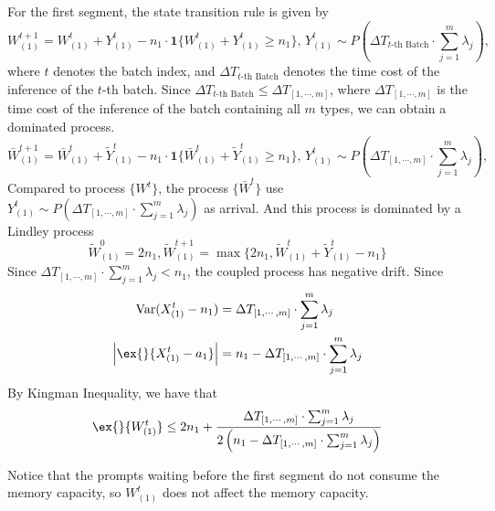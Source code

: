 For the first segment, the state transition rule is given by
$$ W^{t+1}_{(1)} =  W^t_{(1)} + Y^t_{(1)} -n_1\cdot  \mathbf{1}\{ W^t_{(1)} + Y^t_{(1)}\geq n_1 \},\, Y^t_{(1)}\sim P(\Delta T_{ t\text{-th Batch} }\cdot \sum_{j=1}^m \lambda_j), $$
where $t$ denotes the batch index, and $\Delta T_{t\text{-th Batch}}$ denotes the time cost of the inference of the $t$-th batch. Since $\Delta T_{t\text{-th Batch}}\leq \Delta T_{[1,\cdots,m]}$, where $\Delta T_{[1,\cdots,m]}$ is the time cost of the inference of the batch containing all $m$ types, we can obtain a dominated process.
$$ \bar{W}^{t+1}_{(1)} =  \bar{W}^t_{(1)} + \tilde{Y}^t_{(1)} -n_1\cdot  \mathbf{1}\{ \bar{W}^t_{(1)} + \tilde{Y}^t_{(1)}\geq n_1 \},\, Y^t_{(1)}\sim P(\Delta T_{ [1,\cdots,m] }\cdot \sum_{j=1}^m \lambda_j), $$
Compared to process $\{W^t\}$, the process $\{ \bar{W}^t \}$ use $Y^t_{(1)}\sim P(\Delta T_{ [1,\cdots,m] }\cdot \sum_{j=1}^m \lambda_j)$ as arrival. And this process is dominated by a Lindley process
$$\tilde{W}^0_{(1)}=2n_1,  \tilde{W}^{t+1}_{(1)}=\max\{2n_1, \tilde{W}^t_{(1)}+\tilde{Y}^t_{(1)}-n_1\}$$
Since $\Delta T_{ [1,\cdots,m] }\cdot \sum_{j=1}^m \lambda_j<n_1$, the coupled process has negative drift.
Since 
\begin{align*}
    \text{Var}(X^t_{(1)} - n_1) &= \Delta T_{ [1,\cdots,m] }\cdot \sum_{j=1}^m \lambda_j\\
    \left|\ex{}{X^t_{(1)} - a_1}\right| &= n_1 - \Delta T_{ [1,\cdots,m] }\cdot \sum_{j=1}^m \lambda_j
\end{align*}
By Kingman Inequality, we have that
$$\ex{}{W^t_{(1)}}\leq 2n_1 + \frac{\Delta T_{ [1,\cdots,m] }\cdot \sum_{j=1}^m \lambda_j}{2\left( n_1 - \Delta T_{ [1,\cdots,m] }\cdot \sum_{j=1}^m \lambda_j\right)} $$

Notice that the prompts waiting before the first segment do not consume the memory capacity, so $W^t_{(1)}$ does not affect the memory capacity.

